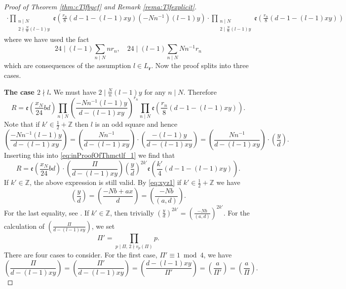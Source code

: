 \documentclass[12pt]{amsart}
\numberwithin{equation}{section}
\theoremstyle{plain}
\theoremstyle{definition}
\theoremstyle{remark}
\newcommand\twoscript[2]{\substack{{#1} \\ {#2}}}
\newcommand\legendre[2]{\genfrac{(}{)}{}{}{#1}{#2}}
\newcommand\etp[1]{\mathfrak{e}\left(#1\right)}
\newcommand\numZ{\mathbb{Z}}
\begin{document}
\begin{proof}[Proof of Theorem \ref{thm:cTlfbycf} and Remark \ref{rema:Tlfexplicit}]
\begin{multline}
\cdot\prod_{\twoscript{n\mid N}{2\nmid\frac{N}{n}(l-1)y}}\etp{\frac{r_n}{8}(d-1-(l-1)xy)(-Nn^{-1})(l-1)y}\cdot\prod_{\twoscript{n\mid N}{2\mid\frac{N}{n}(l-1)y}}\etp{\frac{r_n}{8}(d-1-(l-1)xy)}
\end{multline}
where we have used the fact
\begin{equation}
\label{eq:24midxNandx1}
24\mid(l-1)\sum_{n\mid N}nr_n,\quad24\mid(l-1)\sum_{n\mid N}Nn^{-1}r_n
\end{equation}
which are consequences of the assumption $l\in L_{\mathbf{r}}$. Now the proof splits into three cases.

\textbf{The case $2\nmid l$.} We must have $2\mid\frac{N}{n}(l-1)y$ for any $n\mid N$. Therefore
\begin{equation}
\label{eq:inProofOfThmctlf_1}
R=\etp{\frac{x_N}{24}bd}\prod_{n\mid N}\legendre{-Nn^{-1}(l-1)y}{d-(l-1)xy}^{r_n}\prod_{n\mid N}\etp{\frac{r_n}{8}(d-1-(l-1)xy)}.
\end{equation}
Note that if $k'\in\frac{1}{2}+\numZ$ then $l$ is an odd square and hence
\begin{equation*}
\legendre{-Nn^{-1}(l-1)y}{d-(l-1)xy}=\legendre{Nn^{-1}}{d-(l-1)xy}\cdot\legendre{-(l-1)y}{d-(l-1)xy}=\legendre{Nn^{-1}}{d-(l-1)xy}\cdot\legendre{y}{d}.
\end{equation*}
Inserting this into \eqref{eq:inProofOfThmctlf_1} we find that
\begin{equation}
\label{eq:inProofOfThmctlf_2}
R=\etp{\frac{x_N}{24}bd}\cdot\legendre{\varPi}{d-(l-1)xy}\legendre{y}{d}^{2k'}\etp{\frac{k'}{4}(d-1-(l-1)xy)}.
\end{equation}
If $k'\in\numZ$, the above expression is still valid. By \eqref{eq:xyz1} if $k'\in\frac{1}{2}+\numZ$ we have
\begin{equation}
\label{eq:inProofOfThmctlf_3}
\legendre{y}{d}=\legendre{-Nb+ax}{d}=\legendre{-Nb}{(a,d)}.
\end{equation}
For the last equality, see \cite[p. 567, line -3]{ZZ23}. If $k'\in\numZ$, then trivially $\legendre{y}{d}^{2k'}=\legendre{-Nb}{(a,d)}^{2k'}$. For the calculation of $\legendre{\varPi}{d-(l-1)xy}$, we set
\begin{equation}
\label{eq:defvarPip}
\varPi'=\prod_{p\mid \varPi,\,2\nmid v_p(\varPi)}p.
\end{equation}
There are four cases to consider. For the first case, $\varPi'\equiv1\bmod{4}$, we have
\begin{equation}
\label{eq:inProofOfThmctlf_3h}
\legendre{\varPi}{d-(l-1)xy}=\legendre{\varPi'}{d-(l-1)xy}=\legendre{d-(l-1)xy}{\varPi'}=\legendre{a}{\varPi'}=\legendre{a}{\varPi}.

\end{equation}
\end{proof}
\end{document}
